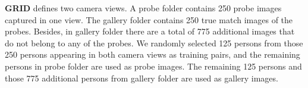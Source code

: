 \documentclass[10pt,twocolumn,letterpaper]{article}
\begin{document}
\textbf{GRID} defines two camera views. A probe folder contains 250 probe images captured in one view. The gallery folder contains 250 true match images of the probes. Besides, in gallery folder there are a total of 775 additional images that do not belong to any of the probes. We randomly selected 125 persons from those 250 persons appearing in both camera views as training pairs, and the remaining persons in probe folder are used as probe images. The remaining 125 persons and those 775 additional persons from gallery folder are used as gallery images. 
\end{document}
